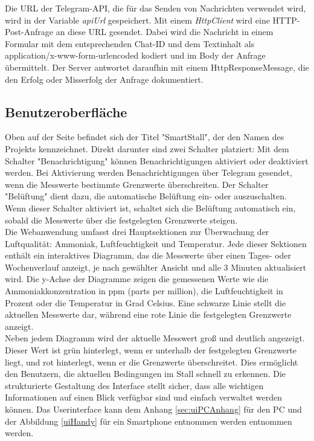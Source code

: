 \documentclass[conference]{IEEEtran}
\begin{document}
Die URL der Telegram-API, die für das Senden von Nachrichten verwendet wird, wird in der Variable \textit{apiUrl} gespeichert. Mit einem \textit{HttpClient} wird eine HTTP-Post-Anfrage an diese URL gesendet. Dabei wird die Nachricht in einem Formular mit dem entsprechenden Chat-ID und dem Textinhalt als application/x-www-form-urlencoded kodiert und im Body der Anfrage übermittelt. Der Server antwortet daraufhin mit einem HttpResponseMessage, die den Erfolg oder Misserfolg der Anfrage dokumentiert.

\subsection{Benutzeroberfläche}
\label{ui}
Oben auf der Seite befindet sich der Titel "SmartStall", der den Namen des Projekts kennzeichnet. Direkt darunter sind zwei Schalter platziert: Mit dem Schalter "Benachrichtigung" können Benachrichtigungen aktiviert oder deaktiviert werden. Bei Aktivierung werden Benachrichtigungen über Telegram gesendet, wenn die Messwerte bestimmte Grenzwerte überschreiten. Der Schalter "Belüftung" dient dazu, die automatische Belüftung ein- oder auszuschalten. Wenn dieser Schalter aktiviert ist, schaltet sich die Belüftung automatisch ein, sobald die Messwerte über die festgelegten Grenzwerte steigen. \\
Die Webanwendung umfasst drei Hauptsektionen zur Überwachung der Luftqualität: Ammoniak, Luftfeuchtigkeit und Temperatur. Jede dieser Sektionen enthält ein interaktives Diagramm, das die Messwerte über einen Tages- oder Wochenverlauf anzeigt, je nach gewählter Ansicht und alle 3 Minuten aktualisiert wird. Die y-Achse der Diagramme zeigen die gemessenen Werte wie die Ammoniakkonzentration in ppm (parts per million), die Luftfeuchtigkeit in Prozent oder die Temperatur in Grad Celsius. Eine schwarze Linie stellt die aktuellen Messwerte dar, während eine rote Linie die festgelegten Grenzwerte anzeigt. \\
Neben jedem Diagramm wird der aktuelle Messwert groß und deutlich angezeigt. Dieser Wert ist grün hinterlegt, wenn er unterhalb der festgelegten Grenzwerte liegt, und rot hinterlegt, wenn er die Grenzwerte überschreitet. Dies ermöglicht den Benutzern, die aktuellen Bedingungen im Stall schnell zu erkennen.
Die strukturierte Gestaltung des Interface stellt sicher, dass alle wichtigen Informationen auf einen Blick verfügbar sind und einfach verwaltet werden können.
Das Userinterface kann dem Anhang \ref{sec:uiPCAnhang} für den PC und der Abbildung \ref{uiHandy} für ein Smartphone entnommen werden entnommen werden. 
\end{document}
